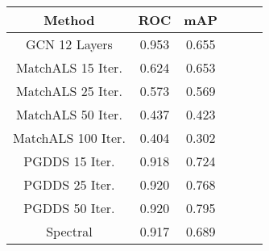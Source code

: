 \documentclass[10pt,twocolumn,letterpaper]{article}
\begin{document}
\begin{table}[t]
\begin{center}
\begin{tabular}{ |c|c|c|c|c|c| }
\hline
Method                                         & ROC    & mAP \\ \hline
GCN 12 Layers                                  & 0.953  & 0.655  \\ \hline
MatchALS \cite{zhou2015multi}  15 Iter.        & 0.624  & 0.653  \\ \hline
MatchALS \cite{zhou2015multi}  25 Iter.        & 0.573  & 0.569  \\ \hline
MatchALS \cite{zhou2015multi}  50 Iter.        & 0.437  & 0.423  \\ \hline
MatchALS \cite{zhou2015multi} 100 Iter.        & 0.404  & 0.302  \\ \hline
PGDDS \cite{leonardos2016distributed} 15 Iter. & 0.918  & 0.724  \\ \hline
PGDDS \cite{leonardos2016distributed} 25 Iter. & 0.920  & 0.768  \\ \hline
PGDDS \cite{leonardos2016distributed} 50 Iter. & 0.920  & 0.795  \\ \hline
Spectral \cite{pachauri2013solving}            & 0.917  & 0.689  \\ \hline
\end{tabular}
\end{center}
\caption{}

\end{table}
\end{document}
